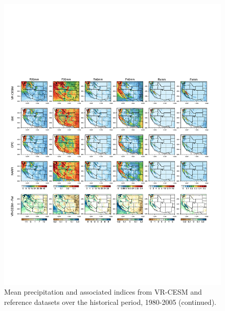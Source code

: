 \documentclass{ametsoc}
\begin{document}
\begin{figure}
\begin{center}
\includegraphics[width=6in, trim={0.6cm 4.5cm 1.2cm 4.9cm},clip]{wd_index_Hist_ref_annual_part3.pdf}
\caption{Mean precipitation and associated indices from VR-CESM and reference datasets over the historical period, 1980-2005 (continued).}
\label{fig:histEval3}
\end{center}
\end{figure}
\end{document}
